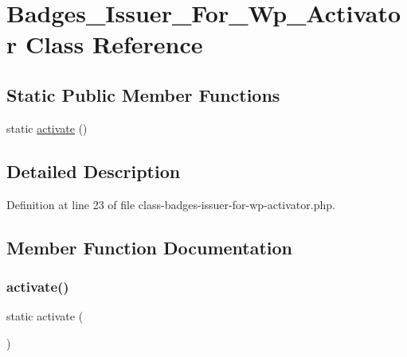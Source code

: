 \hypertarget{class_badges___issuer___for___wp___activator}{}\section{Badges\+\_\+\+Issuer\+\_\+\+For\+\_\+\+Wp\+\_\+\+Activator Class Reference}
\label{class_badges___issuer___for___wp___activator}
\subsection*{Static Public Member Functions}
\begin{DoxyCompactItemize}
\item 
static \hyperlink{class_badges___issuer___for___wp___activator_a8c0d603392741e89ee946ce0237a34cf}{activate} ()
\end{DoxyCompactItemize}


\subsection{Detailed Description}


Definition at line 23 of file class-\/badges-\/issuer-\/for-\/wp-\/activator.\+php.



\subsection{Member Function Documentation}
\mbox{\label{class_badges___issuer___for___wp___activator_a8c0d603392741e89ee946ce0237a34cf}} 
\subsubsection{\texorpdfstring{activate()}{activate()}}
{\footnotesize\ttfamily static activate (\begin{DoxyParamCaption}{ }\end{DoxyParamCaption})\hspace{0.3cm}{\ttfamily [static]}}

